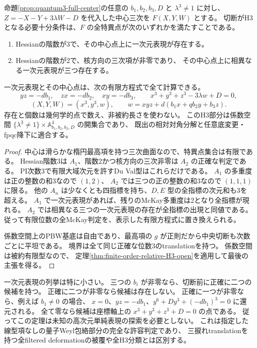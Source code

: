 \begin{theorem}
\label{thm:quantum3-all-parameters}
命題\ref{prop:quantum3-full-center}の任意の $b_1,b_2,b_3,D$ と
$\lambda^3\ne1$ に対し、$Z=-X-Y+3\lambda W-D$ を代入した中心三次を $F(X,Y,W)$ とする。
切断がH3となる必要十分条件は、$F$ の全特異点が次のいずれかを満たすことである。
\begin{enumerate}
\item Hessianの階数が3で、その中心点上に一次元表現が存在する。
\item Hessianの階数が2で、核方向の三次項が非零であり、
その中心点上に相異なる一次元表現が三つ存在する。
\end{enumerate}
一次元表現とその中心点は、次の有限方程式で全て計算できる。
\[
 yz=-db_1,\quad zx=-db_2,\quad xy=-db_3,\qquad
 x^3+y^3+z^3-3\lambda w+D=0,
\]
\[
 (X,Y,W)=(x^3,y^3,w),\qquad
 w=xyz+d(b_1x+qb_2y+b_3z).
\]
存在と個数は幾何学的点で数え、非被約長さを使わない。
このH3部分は係数空間 $\{\lambda^3\ne1\}\times\mathbb A^4_{b_1,b_2,b_3,D}$ の開集合であり、
既出の相対対角分解と任意底変更・fpqc降下に適合する。
\end{theorem}
\begin{proof}
中心は滑らかな楕円最高項を持つ三次曲面なので、特異点集合は有限である。
Hessian階数3は $A_1$、階数2かつ核方向の三次非零は $A_2$ の正確な判定である。
PI次数3で有限大域次元を許すDu Val型はこれらだけである。
$A_1$ の多重度は正の整数の和3なので $(1,2)$、
$A_2$ では三つの正の整数の和3なので $(1,1,1)$ に限る。
他の $A_n$ は少なくとも四指標を持ち、$D,E$ 型の全指標の次元和も3を超える。
$A_1$ で一次元表現があれば、残りのMcKay多重度は2となり全指標が現れる。
$A_2$ では相異なる三つの一次元表現の存在が全指標の出現と同値である。
従って有限位数の全McKay判定を、表示した有限方程式に置き換えられる。

係数空間上のPBW基底は自由であり、最高項の $g$ が正則だから中央切断も次数ごとに平坦である。
境界は全て同じ正確な位数3のtranslationを持つ。
係数空間は被約有限型なので、
定理\ref{thm:finite-order-relative-H3-open}を適用して最後の主張を得る。
\end{proof}

一次元表現の列挙は特に小さい。
三つの $b_i$ が非零なら、切断前に正確に二つの候補を持つ。
正確に二つが非零なら候補は存在しない。
正確に一つが非零なら、例えば $b_1\ne0$ の場合、
$x=0$、$yz=-db_1$、$y^6+Dy^3+(-db_1)^3=0$ に還元される。
全て零なら候補は座標軸上の $x^3+y^3+z^3+D=0$ の点である。
従ってこの定理は未知の高次元単純表現の探索を必要としない。
これは指定した線型項なしの量子Weyl包絡部分の完全な許容判定であり、
三捩れtranslationを持つ全filtered deformationの被覆や全H3分類とは区別する。
